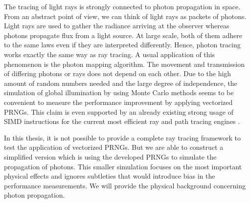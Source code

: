 \documentclass{stdlocal}
\begin{document}
    The tracing of light rays is strongly connected to photon propagation in space.
    From an abstract point of view, we can think of light rays as packets of photons.
    Light rays are used to gather the radiance arriving at the observer whereas photons propagate flux from a light source.
    At large scale, both of them adhere to the same laws even if they are interpreted differently.
    Hence, photon tracing works exactly the same way as ray tracing.
    A usual application of this phenomenon is the photon mapping algorithm.
    The movement and transmission of differing photons or rays does not depend on each other.
    Due to the high amount of random numbers needed and the large degree of independence, the simulation of global illumination by using Monte Carlo methods seems to be convenient to measure the performance improvement by applying vectorized PRNGs.
    This claim is even supported by an already existing strong usage of SIMD instructions for the current most efficient ray and path tracing engines \autocite{embree}.

    In this thesis, it is not possible to provide a complete ray tracing framework to test the application of vectorized PRNGs.
    But we are able to construct a simplified version which is using the developed PRNGs to simulate the propagation of photons.
    This smaller simulation focuses on the most important physical effects and ignores subtleties that would introduce bias in the performance measurements.
    We will provide the physical background concerning photon propagation.



\end{document}
